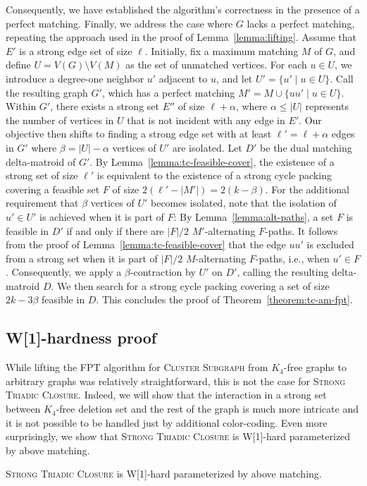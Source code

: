 Consequently, we have established the algorithm's correctness in the presence of a perfect matching.
Finally, we address the case where $G$ lacks a perfect matching, repeating the approach used in the proof of Lemma~\ref{lemma:lifting}.
Assume that $E'$ is a strong edge set of size $\ell$.
Initially, fix a maximum matching $M$ of $G$, and define $U = V(G) \setminus V(M)$ as the set of unmatched vertices.
For each $u \in U$, we introduce a degree-one neighbor $u'$ adjacent to $u$, and let $U' = \{ u' \mid u \in U \}$.
Call the resulting graph $G'$, which has a perfect matching $M' = M \cup \{ uu' \mid u \in U \}$.
Within $G'$, there exists a strong set $E''$ of size $\ell + \alpha$, where $\alpha \le |U|$ represents the number of vertices in $U$ that is not incident with any edge in $E'$.
Our objective then shifts to finding a strong edge set with at least $\ell' = \ell + \alpha$ edges in $G'$ where $\beta = |U| - \alpha$ vertices of $U'$ are isolated.
Let $D'$ be the dual matching delta-matroid of $G'$.
By Lemma~\ref{lemma:tc-feasible-cover}, the existence of a strong set of size $\ell'$ is equivalent to the existence of a strong cycle packing covering a feasible set $F$ of size  $2(\ell' - |M'|) = 2(k - \beta)$.
For the additional requirement that $\beta$ vertices of $U'$ becomes isolated, note that the isolation of $u' \in U'$ is achieved when it is part of $F$:
By Lemma~\ref{lemma:alt-paths}, a set $F$ is feasible in $D'$ if and only if there are $|F|/2$ $M'$-alternating $F$-paths.
It follows from the proof of Lemma~\ref{lemma:tc-feasible-cover} that the edge $uu'$ is excluded from a strong set when it is part of $|F|/2$ $M$-alternating $F$-paths, i.e., when $u' \in F$. 
Consequently, we apply a $\beta$-contraction by $U'$ on $D'$, calling the resulting delta-matroid $D$.
We then search for a strong cycle packing covering a set of size $2k - 3\beta$ feasible in $D$.
This concludes the proof of Theorem~\ref{theorem:tc-am-fpt}.

\subsection{W[1]-hardness proof}\label{ssec:STC-w1-hard}
While lifting the FPT algorithm for \textsc{Cluster Subgraph} from $K_4$-free graphs to arbitrary graphs was relatively straightforward, this is not the case for \textsc{Strong Triadic Closure}. Indeed, we will show that the interaction in a strong set between $K_4$-free deletion set and the rest of the graph is much more intricate and it is not possible to be handled just by additional color-coding. Even more surprisingly, we show that \textsc{Strong Triadic Closure} is W[1]-hard parameterized by above matching.
\begin{theorem}
  \textsc{Strong Triadic Closure} is W[1]-hard parameterized by above matching.
\end{theorem}

